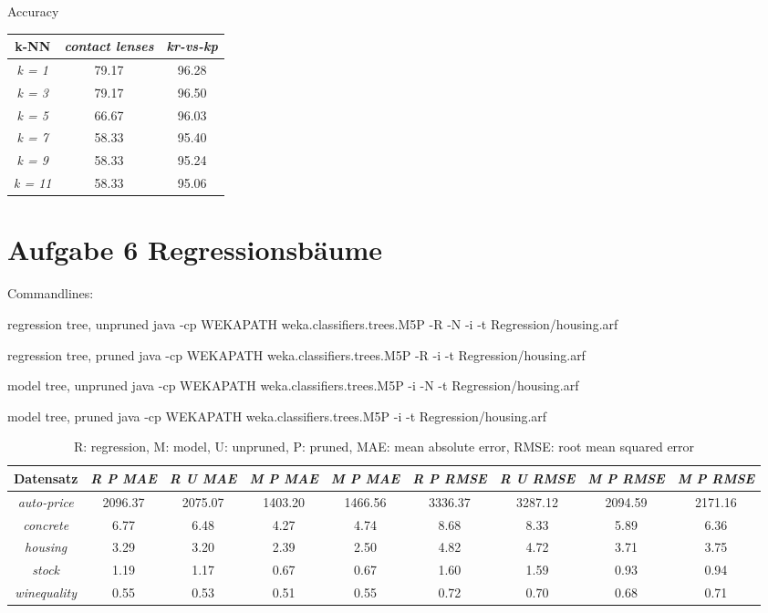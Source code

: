 Accuracy

\begin{tabular}{c|c|c}
                k-NN       & \emph{contact lenses} & \emph{kr-vs-kp}  \\ \hline
				\emph{k = 1} & 79.17  & 96.28  \\ \hline
				\emph{k = 3} & 79.17  & 96.50  \\ \hline
				\emph{k = 5} & 66.67  & 96.03  \\ \hline
				\emph{k = 7} & 58.33  & 95.40  \\ \hline
				\emph{k = 9} & 58.33  & 95.24  \\ \hline
				\emph{k = 11} & 58.33  & 95.06  \\ \hline
\end{tabular}



\section{Aufgabe 6 Regressionsb\"aume}
\label{sec:aufgabe_6_regressionsbaume}


Commandlines: 

regression tree, unpruned
java -cp WEKAPATH weka.classifiers.trees.M5P -R -N -i -t Regression/housing.arf

regression tree, pruned
java -cp WEKAPATH weka.classifiers.trees.M5P -R -i -t Regression/housing.arf

model tree, unpruned
java -cp WEKAPATH weka.classifiers.trees.M5P -i -N -t Regression/housing.arf

model tree, pruned
java -cp WEKAPATH weka.classifiers.trees.M5P -i -t Regression/housing.arf

\begin{table}
\begin{tabular}{c|c|c|c|c|c|c|c|c}
                Datensatz  & \emph{R P MAE } & \emph{R U MAE} & \emph{M P MAE} & \emph{M P MAE} & 
\emph{R P RMSE} & \emph{R U RMSE} & \emph{M P RMSE} & \emph{M P RMSE} \\ \hline
\emph{auto-price}  & 2096.37 & 2075.07& 1403.20 & 1466.56 & 3336.37  & 3287.12 & 2094.59 & 2171.16 \\ \hline
\emph{concrete}    & 6.77 & 6.48& 4.27 & 4.74 &8.68 & 8.33 & 5.89 & 6.36 \\ \hline
\emph{housing}     & 3.29 & 3.20& 2.39 & 2.50 & 4.82 & 4.72 & 3.71 & 3.75 \\ \hline
\emph{stock}       & 1.19 & 1.17& 0.67 & 0.67 & 1.60 & 1.59 & 0.93 & 0.94 \\ \hline
\emph{winequality} & 0.55 & 0.53& 0.51 & 0.55 & 0.72 & 0.70 & 0.68 & 0.71   
\end{tabular}
\caption{R: regression, M: model, U: unpruned, P: pruned, MAE: mean absolute error, RMSE: root mean squared error}
\end{table}




